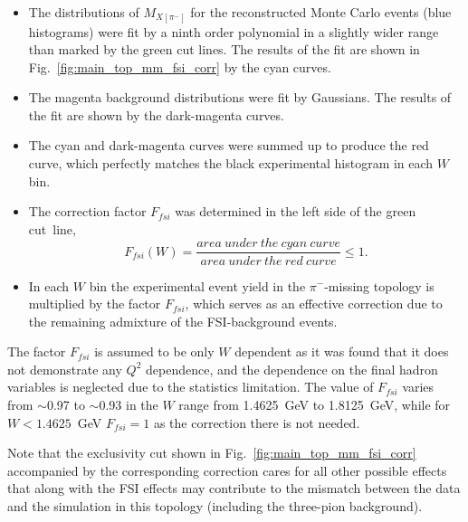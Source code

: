 \begin{itemize}
\item The distributions of $M_{X[\pi^{-}]}$ for the reconstructed Monte Carlo events (blue histograms) were fit by a ninth order polynomial in a slightly wider range than marked by the green cut lines. The results of the fit are shown in Fig.~\ref{fig:main_top_mm_fsi_corr} by the cyan curves.
\item The magenta background distributions were fit by Gaussians. The results of the fit are shown by the dark-magenta curves.
\item The cyan and dark-magenta curves were summed up to produce the red curve, which perfectly matches the black experimental histogram in each $W$ bin.
\item The correction factor $F_{fsi}$ was determined in the left side of the green cut~line,
\begin{equation}
 F_{fsi}(W) = \frac{area~under~the~cyan~curve}{area~under~the~red~curve} \leq 1.\label{eq:fsi_corr_fact}
\end{equation}\label{eq:fsi_corr}\vspace{-3em}
\item In each $W$ bin the experimental event yield in the $\pi^{-}$-missing topology is multiplied by the factor $F_{fsi}$, which serves as an effective correction due to the remaining admixture of the FSI-background events.
\end{itemize}


The factor $F_{fsi}$ is assumed to be only $W$ dependent as it was found that it does not demonstrate any $Q^{2}$ dependence, and the dependence on the final hadron variables is neglected due to the statistics limitation. The value of $F_{fsi}$ varies from $\sim$0.97 to $\sim$0.93 in the $W$ range from 1.4625~GeV to 1.8125~GeV, while for $W < 1.4625$~GeV $F_{fsi}=1$ as the correction there is not needed.


Note that the exclusivity cut shown in Fig.~\ref{fig:main_top_mm_fsi_corr} accompanied by the corresponding correction cares for all other possible effects that along with the FSI effects may contribute to the mismatch between the data and the simulation in this topology (including the three-pion background).

